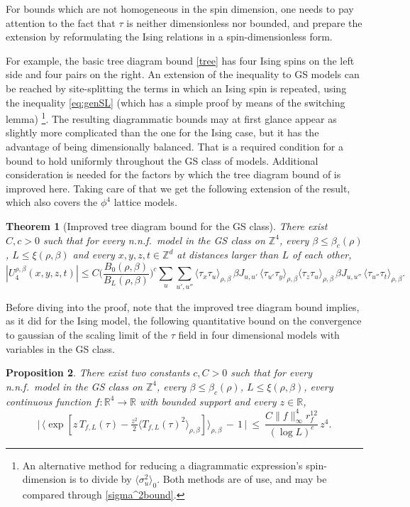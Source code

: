 \documentclass[a4paper,oneside,11pt]{article}
\def\Z{\mathbb{Z}}                          %
\def\R{\mathbb{R}}
\newtheorem{theorem}{Theorem}[section]
\newtheorem{proposition}[theorem]{Proposition}
\newcommand{\be}[1]{\begin{equation}\label{#1}}
\newcommand{\ee}{\end{equation}}
\numberwithin{equation}{section}
\numberwithin{equation}{section}
\numberwithin{equation}{section}
\def\Z{\mathbb{Z}}                          %
\def\be{\begin{equation}}
\def\ee{\end{equation}}
\begin{document}
For bounds which are not homogeneous in the spin dimension, one needs to pay attention to the fact that $\tau$ is neither dimensionless nor bounded, and prepare the extension by reformulating the Ising relations in a spin-dimensionless form.   
 
For example,  the basic tree diagram bound \eqref{tree} has four Ising spins on the left side and four pairs on the right.  An extension of the inequality to GS models can be reached by site-splitting the terms in which  an Ising spin is repeated, using the inequality \eqref{eq:genSL}
 (which has a simple proof by means of the switching lemma)
 \footnote{An alternative method for reducing a diagrammatic expression's spin-dimension is to divide by $\langle \sigma_u^2\rangle_0$.  Both methods are of use, and may be compared through   
 \eqref{sigma^2bound}.}.
   The resulting diagrammatic bounds  may at first glance appear as slightly more complicated than the one for the Ising case, but it has the advantage of being  dimensionally balanced.  That is a required condition for a bound to hold uniformly throughout the GS class of models.
 Additional consideration is needed for the factors by which the tree diagram bound of \cite{Aiz82} is improved here.   Taking care of that we get the following extension of the result, which also covers the $\phi^4$ lattice models. 



\begin{theorem}[Improved tree diagram bound for the GS class]\label{thm:improved GS tree bound} There exist $C,c>0$ such that for every  n.n.f.~model in the GS class on $\Z^4$, every $\beta\le \beta_c(\rho)$,  $L\le \xi(\rho,\beta)$ and every $x,y,z,t\in\Z^d$ at distances larger than $L$ of each other,
\be\label{eq:improved tree bound GS}
|U_4^{\rho,\beta}(x,y,z,t)|\le C\Big(
\frac{B_0(\rho,\beta)}{B_L(\rho,\beta)}\Big)^c\sum_{u} \sum_{u',u''} 
\langle\tau_x\tau_u\rangle_{\rho,\beta} \,\beta J_{u,u'}\, \langle\tau_{u'}\tau_y\rangle_{\rho,\beta}\langle\tau_z\tau_u\rangle_{\rho,\beta}\,\beta J_{u,u''}\,  \langle\tau_{u''}\tau_t\rangle_{\rho,\beta}.
\ee
\end{theorem}
Before diving into the proof, note that the improved tree diagram bound implies, as it did for the Ising model, 
the following quantitative bound on the convergence to gaussian of the scaling limit of the $\tau$ field
in four dimensional models with variables  in the GS class. 
\begin{proposition}\label{prop:gaussian b_GS}
There exist two constants $c,C>0$ such that for every n.n.f.~model in the GS class on $\Z^4$, every $\beta\le \beta_c(\rho)$,  $L\le \xi(\rho,\beta)$, every continuous function $f:\R^4\rightarrow\R$ with bounded support and every $z\in\mathbb R$,
\be \label{eq:gauss_GS}
 \Big|\,\big\langle \exp[z\,T_{f,L}(\tau)-\tfrac{z^2}2\langle T_{f,L}(\tau)^2\rangle_{\rho,\beta} ]\big\rangle_{\rho,\beta}\,-\,1\,\Big|~\le~ \frac{C\|f\|_\infty^4r_f^{12}}{(\log L)^c}\,z^4.
\ee
\end{proposition}
\end{document}
